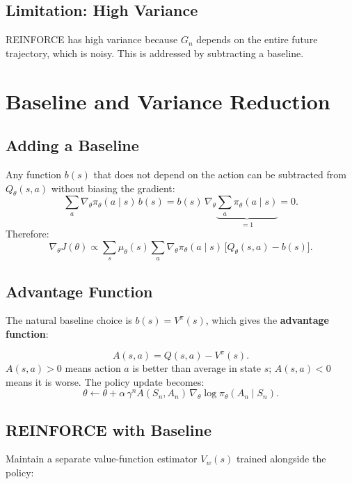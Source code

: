 \documentclass[11pt,a4paper]{article}
\theoremstyle{definition}
\theoremstyle{plain}
\theoremstyle{remark}
\begin{document}
\subsection{Limitation: High Variance}

REINFORCE has high variance because $G_n$ depends on the entire future trajectory, which is noisy. This is addressed by subtracting a baseline.

\section{Baseline and Variance Reduction}

\subsection{Adding a Baseline}

Any function $b(s)$ that does not depend on the action can be subtracted from $Q_\theta(s,a)$ without biasing the gradient:
\[
    \sum_a \nabla_\theta \pi_\theta(a \mid s)\, b(s)
    = b(s)\, \nabla_\theta \underbrace{\sum_a \pi_\theta(a \mid s)}_{=1} = 0.
\]
Therefore:
\[
    \nabla_\theta J(\theta) \propto \sum_s \mu_\theta(s) \sum_a \nabla_\theta \pi_\theta(a \mid s)\,\bigl[Q_\theta(s,a) - b(s)\bigr].
\]

\subsection{Advantage Function}

The natural baseline choice is $b(s) = V^\pi(s)$, which gives the \textbf{advantage function}:

\begin{tcolorbox}[colback=blue!5!white,colframe=blue!75!black,title=\textbf{Advantage Function}]
\[
    A(s, a) = Q(s, a) - V^\pi(s).
\]
$A(s,a) > 0$ means action $a$ is better than average in state $s$; $A(s,a) < 0$ means it is worse. The policy update becomes:
\[
    \theta \leftarrow \theta + \alpha\, \gamma^n A(S_n, A_n)\, \nabla_\theta \log \pi_\theta(A_n \mid S_n).
\]
\end{tcolorbox}

\subsection{REINFORCE with Baseline}

Maintain a separate value-function estimator $V_w(s)$ trained alongside the policy:
\end{document}
